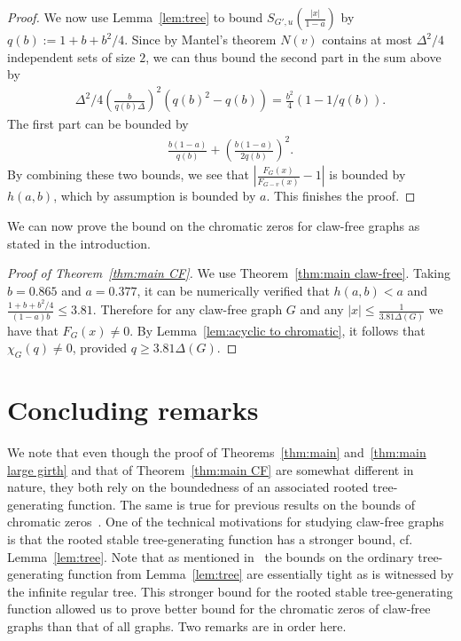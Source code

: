 \documentclass[a4paper,11pt,reqno]{amsart}
\numberwithin{equation}{section}
\begin{document}
\begin{proof}
We now use Lemma~\ref{lem:tree} to bound $S_{G',u}\left(\tfrac{|x|}{1-a}\right)$ by $q(b):=1+b+b^2/4$.
Since by Mantel's theorem $N(v)$ contains at most $\Delta^2/4$ independent sets of size $2$, we can thus bound the second part in the sum above by
\begin{align*}
\Delta^2/4 \left(\tfrac{b}{q(b)\Delta}\right)^2(q(b)^2-q(b))=\tfrac{b^2}{4}(1-1/q(b)).
\end{align*}
The first part can be bounded by 
\begin{align*}
\frac{b(1-a)}{q(b)}+\left(\frac{b(1-a)}{2q(b)}\right)^2.
\end{align*} 
By combining these two bounds, we see that $\left|\frac{F_{G}(x)}{F_{G-v}(x)}-1\right|$ is bounded by $h(a,b)$, which by assumption is bounded by $a$.
This finishes the proof.
\end{proof}


We can now prove the bound on the chromatic zeros for claw-free graphs as stated in the introduction.

\begin{proof}[Proof of Theorem~\ref{thm:main CF}]
We use Theorem~\ref{thm:main claw-free}.
Taking $b=0.865$ and $a=0.377$, it can be numerically verified that $h(a,b)<a$ and $\tfrac{1+b+b^2/4}{(1-a)b}\leq 3.81$.
Therefore for any claw-free graph $G$ and any $|x|\leq \tfrac{1}{3.81\Delta(G)}$ we have that $F_{G}(x)\neq 0$.
By Lemma~\ref{lem:acyclic to chromatic}, it follows that $\chi_G(q)\neq 0$, provided $q\geq 3.81\Delta(G)$.
\end{proof}



\section{Concluding remarks}\label{sec:remarks}
We note that even though the proof of Theorems~\ref{thm:main} and~\ref{thm:main large girth} and that of Theorem~\ref{thm:main CF} are somewhat different in nature, they both rely on the boundedness of an associated rooted tree-generating function.
The same is true for previous results on the bounds of chromatic zeros~\cites{sokal,Fernandez,JPR24}.
One of the technical motivations for studying claw-free graphs is that the rooted stable tree-generating function has a stronger bound, cf. Lemma~\ref{lem:tree}.
Note that as mentioned in~\cite{JPR24} the bounds on the ordinary tree-generating function from Lemma~\ref{lem:tree} are essentially tight as is witnessed by the infinite regular tree.
This stronger bound for the rooted stable tree-generating function allowed us to prove better bound for the chromatic zeros of claw-free graphs than that of all graphs.
Two remarks are in order here. 
\end{document}

